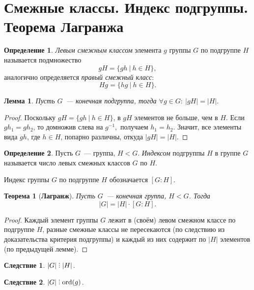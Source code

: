 \documentclass[a4paper, 14pt]{extarticle}
\newcommand{\n}{\par}
\newcommand{\ord}{\mathrm{ord}}
\DeclareRobustCommand{\divby}{%
	\mathrel{\text{\vbox{\baselineskip.65ex\lineskiplimit0pt\hbox{.}\hbox{.}\hbox{.}}}}%
}
\theoremstyle{definition}
\newtheorem{definition}{Определение}
\theoremstyle{plain}
\newtheorem*{theorem*}{Теорема}
\numberwithin{theorem}{section}
\numberwithin{definition}{section}
\numberwithin{statement}{section}
\newtheorem*{lemma*}{Лемма}
\numberwithin{lemma}{section}
\newtheorem{consequence}{Следствие}
\numberwithin{consequence}{section}
\begin{document}
	\section{Смежные классы. Индекс подгруппы. Теорема Лагранжа}
	\setcounter{definition}{0}
		\begin{definition}
			\textit{Левым смежным классом} элемента $g$ группы $G$ по подгруппе $H$ называется подмножество
			\begin{equation*}
				gH = \{gh \ | \ h \in H\},
			\end{equation*}
			аналогично определяется \textit{правый смежный класс}:
			\begin{equation*}
				Hg = \{hg \ | \ h \in H\}.
			\end{equation*}
		\end{definition}
		\begin{lemma*}
			Пусть $G$~--- конечная подгруппа, тогда $\forall g \in G{:} \ |gH| = |H|.$
		\end{lemma*}
		\begin{proof}
			Поскольку ${gH = \{gh \ | \ h \in H\}}$, в $gH$ элементов не больше, чем в $H$. Если ${gh_1 = gh_2}$, то домножив слева на $g^{-1},$ получаем ${h_1 = h_2}$. Значит, все элементы вида $gh$, где ${h \in H}$, попарно различны, откуда ${|gH| = |H|}$.
		\end{proof}
		\begin{definition}
			Пусть $G$~--- группа, $H < G$. \textit{Индексом} подгруппы $H$ в группе $G$ называется число левых смежных классов $G$ по $H$.
		\end{definition} \n
		Индекс группы $G$ по подгруппе $H$ обозначается $[G : H]$.
		\begin{theorem*}[\textbf{Лагранж}]
			Пусть $G$~--- конечная группа, $H < G$. Тогда
			\begin{equation*}
				|G| = |H| \cdot [G : H].
			\end{equation*}
		\end{theorem*}
		\begin{proof}
			Каждый элемент группы $G$ лежит в (своём) левом смежном классе по подгруппе $H$, разные смежные классы не пересекаются (по следствию из доказательства критерия подгруппы) и каждый из них содержит по $|H|$ элементов (по предыдущей лемме).
		\end{proof}
		\newpage
		\begin{consequence}
			$|G| \divby |H|$.
		\end{consequence}
		\begin{consequence}
			$|G| \divby \ord(g)$.
		\end{consequence}
\end{document}

